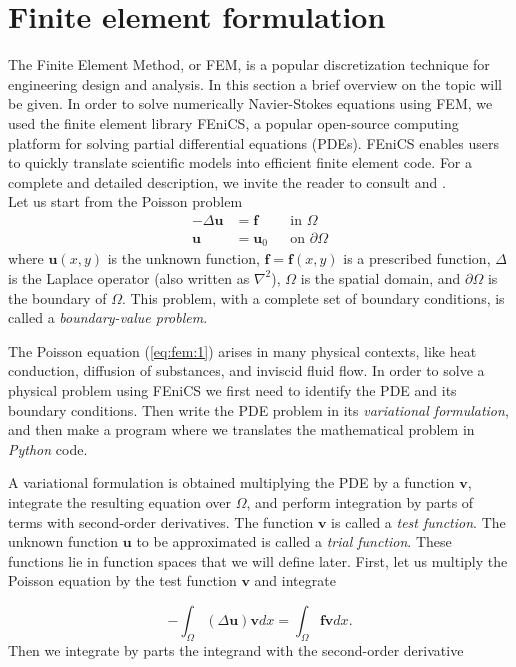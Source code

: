 \documentclass[a4paper,11pt,oneside]{book}
\begin{document}
\section{Finite element formulation}
The Finite Element Method, or FEM, is a popular discretization technique for engineering design and analysis. In this section a brief overview on the topic will be given. In order to solve numerically Navier-Stokes equations using FEM, we used the finite element library FEniCS, a popular open-source computing platform for solving partial differential equations (PDEs). FEniCS enables users to quickly translate scientific models into efficient finite element code. For a complete and detailed description, we invite the reader to consult \cite{quarteroni1} and \cite{logg}. \\ Let us start from the Poisson problem
\begin{align}
\label{eq:fem:1}
- \Delta \mathbf{u} &= \mathbf{f} &&\text{in } \Omega \\
\mathbf{u} &= \mathbf{u}_0 &&\text{on } \partial \Omega
\end{align}
where $\mathbf{u}(x,y)$ is the unknown function, $\mathbf{f} = \mathbf{f}(x,y)$ is a prescribed function, $\Delta$ is the Laplace operator (also written as $\nabla^2$), $\Omega$ is the spatial domain, and $\partial \Omega$ is the boundary of $\Omega$. This problem, with a complete set of boundary conditions, is called a \emph{boundary-value problem}.

The Poisson equation (\ref{eq:fem:1}) arises in many physical contexts, like heat conduction, diffusion of substances, and inviscid fluid flow. In order to solve a physical problem using FEniCS we first need to identify the PDE and its boundary conditions. Then write the PDE problem in its \emph{variational formulation}, and then make a program where we translates the mathematical problem in \emph{Python} code.

A variational formulation is obtained multiplying the PDE by a function $\mathbf{v}$, integrate the resulting equation over $\Omega$, and perform integration by parts of terms with second-order derivatives. The function $\mathbf{v}$ is called a \emph{test function}. The unknown function $\mathbf{u}$ to be approximated is called a \emph{trial function}. These functions lie in function spaces that we will define later. First, let us multiply the Poisson equation by the test function $\mathbf{v}$ and integrate

\begin{equation}
\label{eq:fem:2}
- \int_\Omega (\Delta \mathbf{u}) \mathbf{v} dx = \int_\Omega \mathbf{f} \mathbf{v} dx.
\end{equation}
Then we integrate by parts the integrand with the second-order derivative
\end{document}
